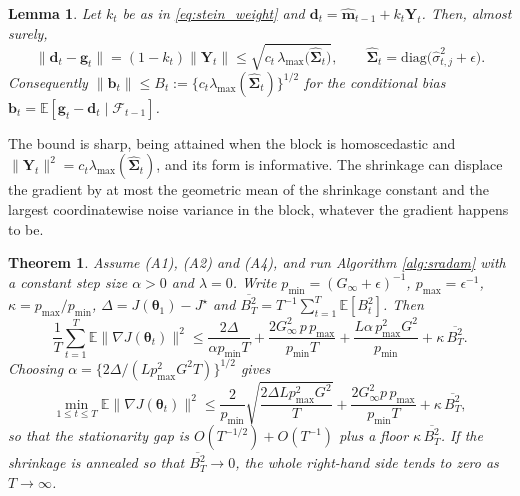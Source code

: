 \documentclass[pdflatex,sn-mathphys-num]{sn-jnl}%
\theoremstyle{thmstyleone}%
\newtheorem{theorem}{Theorem}%
\theoremstyle{thmstyletwo}%
\newtheorem{lemma}{Lemma}%
\theoremstyle{thmstylethree}%
\newcommand{\diag}{\mathrm{diag}}
\newcommand{\E}{\mathbb{E}}
\begin{document}
\begin{lemma}
\label{lem:displacement}
Let $k_t$ be as in \eqref{eq:stein_weight} and $\bm d_t=\hat{\bm m}_{t-1}+k_t\bm Y_t$. Then, almost surely,
\begin{equation}
\label{eq:displacement}
\bigl\|\bm d_t-\bm g_t\bigr\|
=
(1-k_t)\|\bm Y_t\|
\le
\sqrt{c_t\,\lambda_{\max}\bigl(\widehat{\bm\Sigma}_t\bigr)},
\qquad
\widehat{\bm\Sigma}_t=\diag\bigl(\hat\sigma^2_{t,j}+\epsilon\bigr).
\end{equation}
Consequently $\|\bm b_t\|\le B_t:=\{c_t\lambda_{\max}(\widehat{\bm\Sigma}_t)\}^{1/2}$ for the conditional bias $\bm b_t=\E[\bm g_t-\bm d_t\mid\mathcal F_{t-1}]$.
\end{lemma}

The bound is sharp, being attained when the block is homoscedastic and $\|\bm Y_t\|^2=c_t\lambda_{\max}(\widehat{\bm\Sigma}_t)$, and its form is informative. The shrinkage can displace the gradient by at most the geometric mean of the shrinkage constant and the largest coordinatewise noise variance in the block, whatever the gradient happens to be.

\begin{theorem}
\label{thm:convergence}
Assume (A1), (A2) and (A4), and run Algorithm \ref{alg:sradam} with a constant step size $\alpha>0$ and $\lambda=0$. Write $p_{\min}=(G_\infty+\epsilon)^{-1}$, $p_{\max}=\epsilon^{-1}$, $\kappa=p_{\max}/p_{\min}$, $\Delta=J(\bm\theta_1)-J^\star$ and $\overline{B^2_T}=T^{-1}\sum_{t=1}^{T}\E[B^2_t]$. Then
\begin{equation}
\label{eq:conv_bound}
\frac1T\sum_{t=1}^{T}\E\bigl\|\nabla J(\bm\theta_t)\bigr\|^{2}
\le
\frac{2\Delta}{\alpha p_{\min}T}
+\frac{2G_\infty^{2}\,p\,p_{\max}}{p_{\min}T}
+\frac{L\alpha\,p^{2}_{\max}G^{2}}{p_{\min}}
+\kappa\,\overline{B^2_T} .
\end{equation}
Choosing $\alpha=\{2\Delta/(Lp^2_{\max}G^2T)\}^{1/2}$ gives
\begin{equation}
\label{eq:conv_rate}
\min_{1\le t\le T}\E\bigl\|\nabla J(\bm\theta_t)\bigr\|^{2}
\le
\frac{2}{p_{\min}}\sqrt{\frac{2\Delta L p^2_{\max}G^2}{T}}
+\frac{2G_\infty^{2}p\,p_{\max}}{p_{\min}T}
+\kappa\,\overline{B^2_T},
\end{equation}
so that the stationarity gap is $O(T^{-1/2})+O(T^{-1})$ plus a floor $\kappa\,\overline{B^2_T}$. If the shrinkage is annealed so that $\overline{B^2_T}\to0$, the whole right-hand side tends to zero as $T\to\infty$.
\end{theorem}
\end{document}
